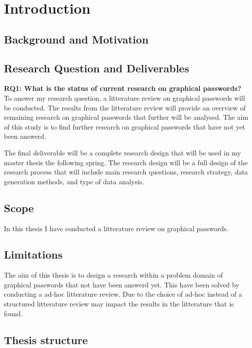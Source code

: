 \chapter{Introduction}

  \section{Background and Motivation}
    

  \section{Research Question and Deliverables}
    
    {\bf RQ1: What is the status of current research on graphical passwords?} \\

    To answer my research question, a litterature review on graphical passwords will be conducted. The results from the litterature review will provide an overview of remaining research on graphical passwords that further will be analysed. The aim of this study is to find further research on graphical passwords that have not yet been answerd. 

    The final deliverable will be a complete research design that will be used in my master thesis the following spring. The research design will be a full design of the research process that will include main research questions, research strategy, data generation methods, and type of data analysis.

  \section{Scope}

    In this thesis I have conducted a litterature review on graphical passwords. 


  \section{Limitations}

    The aim of this thesis is to design a research within a problem domain of graphical passwords that not have been answerd yet. This have been solved by conducting a ad-hoc litterature review. Due to the choice of ad-hoc instead of a structured litterature review may impact the results in the litterature that is found. 


  \section{Thesis structure}






